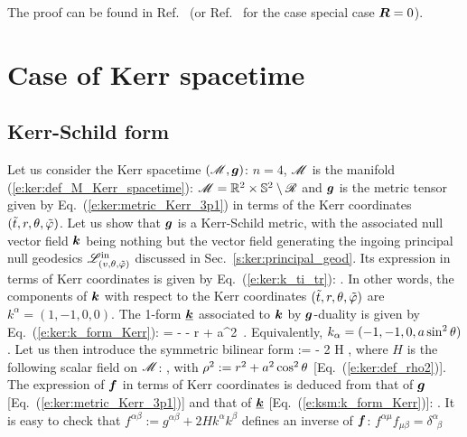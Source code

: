 The proof can be found in Ref.~\cite{OrtagPP09} (or Ref.~\cite{KerrS65} for the case
special case $\bm{R} = 0$).



\section{Case of Kerr spacetime}

\subsection{Kerr-Schild form}

Let us consider the Kerr spacetime $(\mathscr{M},\bm{g})$: $n=4$,  $\mathscr{M}$ is the manifold
(\ref{e:ker:def_M_Kerr_spacetime}): $\mathscr{M} = \mathbb{R}^2\times\mathbb{S}^2 \setminus \mathscr{R}$
and $\bm{g}$ is the metric tensor given by Eq.~(\ref{e:ker:metric_Kerr_3p1})
in terms of the Kerr coordinates $({\tilde t}, r, \theta,{\tilde\varphi})$.
Let us show that $\bm{g}$ is a Kerr-Schild metric, with the associated null vector
field $\bm{k}$ being nothing but the vector field generating the
ingoing principal null geodesics $\mathscr{L}^{\rm in}_{(v,\theta,{\tilde\varphi})}$  discussed in Sec.~\ref{s:ker:principal_geod}.
Its expression in terms of Kerr coordinates is given by Eq.~(\ref{e:ker:k_ti_tr}):
\be \label{e:ksm:k_Kerr}
     .
\ee
In other words, the components of $\bm{k}$ with respect to the Kerr coordinates $({\tilde t}, r, \theta,{\tilde\varphi})$ are $k^\alpha = (1, -1, 0, 0)$.
The 1-form $\underline{\bm{k}}$ associated to $\bm{k}$ by $\bm{g}$-duality is
given by Eq.~(\ref{e:ker:k_form_Kerr}):
\be \label{e:ksm:k_form_Kerr}
     = - \dd \ti - \dd r + a\sin^2\th \, \dd\tph .
\ee
Equivalently, $k_\alpha = (-1, -1, 0, a\sin^2\theta)$.
Let us then introduce the symmetric bilinear form
\be
     :=  - 2 H  \otimes {} ,
\ee
where $H$ is the following scalar field on $\mathscr{M}$:
\be \label{e:ksm:H_Kerr}
   ,
\ee
with $\rho^2 := r^2 + a^2 \cos^2\theta$ [Eq.~(\ref{e:ker:def_rho2})].
The expression of $\bm{f}$ in terms of Kerr coordinates is deduced
from that of $\bm{g}$ [Eq.~(\ref{e:ker:metric_Kerr_3p1})] and that of
$\underline{\bm{k}}$ [Eq.~(\ref{e:ksm:k_form_Kerr})]:
\be \label{e:ksm:f_Kerr}
  .
\ee
It is easy to check that $f^{\alpha\beta} := g^{\alpha\beta} + 2 H k^\alpha k^\beta$
defines an inverse of $\bm{f}$: $f^{\alpha\mu} f_{\mu\beta} = \delta^\alpha_{\ \; \beta}$

